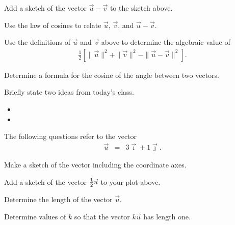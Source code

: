 \begin{problem}
  \begin{subproblem}
    \item Add a sketch of the vector $\vec{u}-\vec{v}$ to the sketch above.
    \item Use the law of cosines to relate $\vec{u}$, $\vec{v}$, and $\vec{u}-\vec{v}$.
      \vspace{4em}
    \item Use the definitions of $\vec{u}$ and $\vec{v}$ above to determine the algebraic value of
    \begin{eqnarray*}
      \frac{1}{2} \left[ \|\vec{u}\|^2 +  \|\vec{v}\|^2 -  \|\vec{u}-\vec{v}\|^2\right].
    \end{eqnarray*}
    \vfill
    \item Determine a formula for the cosine of the angle between two vectors.
    \vspace{4em}
  \end{subproblem}

\end{problem}


\postClass

\begin{problem}
\item Briefly state two ideas from today's class.
  \begin{itemize}
  \item
  \item
  \end{itemize}
\item
  \begin{subproblem}
    \item
  \end{subproblem}
\end{problem}


\begin{problem}
\item The following questions refer to the vector
\begin{eqnarray*}
  \vec{u} & = & 3 \vec{\imath} + 1 \vec{\jmath}.
\end{eqnarray*}
\begin{subproblem}
    \item Make a sketch of the vector including the coordinate axes.
    \vfill
    \item Add a sketch of the vector $\mbox{$\frac{1}{2}$} \vec{u}$ to your plot above.
    \item Determine the length of the vector $\vec{u}$.
    \vfill
    \item Determine values of $k$ so that the vector $k \vec{u}$ has length one.
    \vfill
\end{subproblem}
\end{problem}


